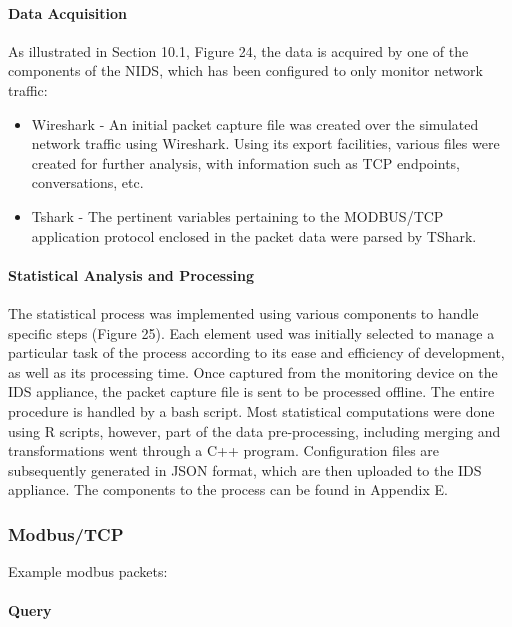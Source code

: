 \documentclass[12pt,]{article}
\begin{document}
\paragraph{Data Acquisition}\label{data-acquisition}

As illustrated in Section 10.1, Figure 24, the data is acquired by one
of the components of the NIDS, which has been configured to only monitor
network traffic:

\begin{itemize}
\itemsep1pt\parskip0pt
\item
  Wireshark - An initial packet capture file was created over the
  simulated network traffic using Wireshark. Using its export
  facilities, various files were created for further analysis, with
  information such as TCP endpoints, conversations, etc.
\item
  Tshark - The pertinent variables pertaining to the MODBUS/TCP
  application protocol enclosed in the packet data were parsed by
  TShark.
\end{itemize}

\paragraph{Statistical Analysis and
Processing}\label{statistical-analysis-and-processing}

The statistical process was implemented using various components to
handle specific steps (Figure 25). Each element used was initially
selected to manage a particular task of the process according to its
ease and efficiency of development, as well as its processing time. Once
captured from the monitoring device on the IDS appliance, the packet
capture file is sent to be processed offline. The entire procedure is
handled by a bash script. Most statistical computations were done using
R scripts, however, part of the data pre-processing, including merging
and transformations went through a C++ program. Configuration files are
subsequently generated in JSON format, which are then uploaded to the
IDS appliance. The components to the process can be found in Appendix E.

\subsubsection{Modbus/TCP}\label{modbustcp-1}

Example modbus packets:

\paragraph{Query}\label{query}
\end{document}
